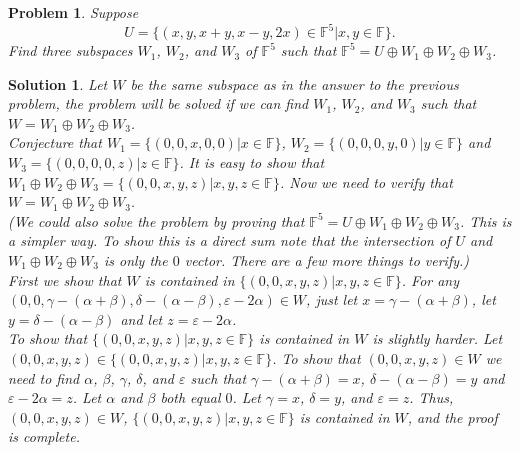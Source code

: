 \documentclass{article}
\theoremstyle{problemstyle}
\newtheorem{problem}{Problem}
\theoremstyle{problemstyle}
\newtheorem{solution}{Solution}
\begin{document}
\begin{problem}
Suppose $$U = \{(x,y,x+y,x-y,2x) \in \mathbb{F}^5 | x,y \in \mathbb{F}\}.$$ Find three subspaces $W_1$, $W_2$, and $W_3$ of $\mathbb{F}^5$ such that $\mathbb{F}^5 = U \oplus W_1 \oplus W_2  \oplus W_3$.
\end{problem}
\begin{solution}
Let $W$ be the same subspace as in the answer to the previous problem, the problem will be solved if we can find $W_1$, $W_2$, and $W_3$ such that $W = W_1 \oplus W_2  \oplus W_3$.\\

Conjecture that $W_1 = \{(0,0,x,0,0)|x \in \mathbb{F}\}$, $W_2 = \{(0,0,0,y,0)|y \in \mathbb{F}\}$ and $W_3 = \{(0,0,0,0,z)|z \in \mathbb{F}\}$. It is easy to show that $W_1 \oplus W_2  \oplus W_3 = \{(0,0,x,y,z)|x,y,z \in \mathbb{F}\}$. Now we need to verify that $W = W_1 \oplus W_2  \oplus W_3$.\\

(We could also solve the problem by proving that $\mathbb{F}^5 = U \oplus W_1 \oplus W_2  \oplus W_3$. This is a simpler way. To show this is a direct sum note that the intersection of $U$ and $W_1 \oplus W_2  \oplus W_3$ is only the $0$ vector. There are a few more things to verify.)\\ 


First we show that $W$ is contained in $\{(0,0,x,y,z)|x,y,z \in \mathbb{F}\}$.  For any $(0,0,\gamma - (\alpha + \beta), \delta - (\alpha - \beta), \varepsilon - 2\alpha) \in W$, just let $x = \gamma - (\alpha + \beta)$, let $y = \delta - (\alpha - \beta)$ and let $z = \varepsilon - 2\alpha$.\\ 

To show that $\{(0,0,x,y,z)|x,y,z \in \mathbb{F}\}$ is contained in $W$ is slightly harder.  Let $(0,0,x,y,z) \in \{(0,0,x,y,z)|x,y,z \in \mathbb{F}\}$.  To show that  $(0,0,x,y,z) \in W$ we need to find $\alpha$, $\beta$, $\gamma$, $\delta$, and $\varepsilon$ such that  $\gamma - (\alpha + \beta) = x$, $\delta - (\alpha - \beta) = y$ and $\varepsilon - 2\alpha = z$. Let $\alpha$ and $\beta$ both equal $0$. Let $\gamma = x$, $\delta = y$, and $\varepsilon = z$. Thus, $(0,0,x,y,z) \in W$, $\{(0,0,x,y,z)|x,y,z \in \mathbb{F}\}$ is contained in $W$, and the proof is complete. 
\end{solution}
\end{document}
